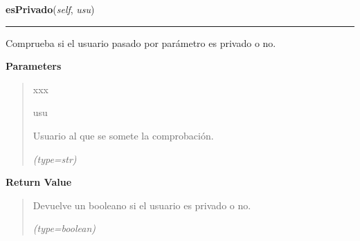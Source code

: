 \hspace{.8\funcindent}\begin{boxedminipage}{\funcwidth}

    \raggedright \textbf{esPrivado}(\textit{self}, \textit{usu})

    \vspace{-1.5ex}

    \rule{\textwidth}{0.5\fboxrule}
\setlength{\parskip}{2ex}
    Comprueba si el usuario pasado por parámetro es privado o no.

\setlength{\parskip}{1ex}
      \textbf{Parameters}
      \vspace{-1ex}

      \begin{quote}
        \begin{Ventry}{xxx}

          \item[usu]

          Usuario al que se somete la comprobación.

            {\it (type=str)}

        \end{Ventry}

      \end{quote}

      \textbf{Return Value}
    \vspace{-1ex}

      \begin{quote}
      Devuelve un booleano si el usuario es privado o no.

      {\it (type=boolean)}

      \end{quote}

    \end{boxedminipage}

    \label{funcionesTwitter:FuncionesTwitter:existeUsuario}

    \vspace{0.5ex}

